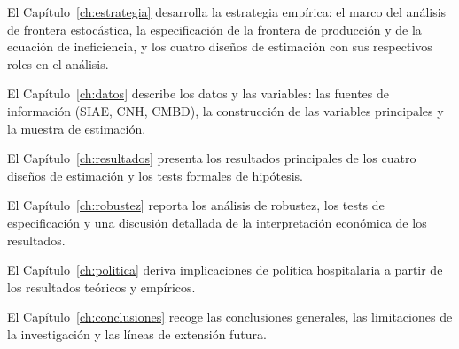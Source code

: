 El Capítulo~\ref{ch:estrategia} desarrolla la estrategia empírica: el marco del análisis de frontera estocástica, la especificación de la frontera de producción y de la ecuación de ineficiencia, y los cuatro diseños de estimación con sus respectivos roles en el análisis.

El Capítulo~\ref{ch:datos} describe los datos y las variables: las fuentes de información (SIAE, CNH, CMBD), la construcción de las variables principales y la muestra de estimación.

El Capítulo~\ref{ch:resultados} presenta los resultados principales de los cuatro diseños de estimación y los tests formales de hipótesis.

El Capítulo~\ref{ch:robustez} reporta los análisis de robustez, los tests de especificación y una discusión detallada de la interpretación económica de los resultados.

El Capítulo~\ref{ch:politica} deriva implicaciones de política hospitalaria a partir de los resultados teóricos y empíricos.

El Capítulo~\ref{ch:conclusiones} recoge las conclusiones generales, las limitaciones de la investigación y las líneas de extensión futura.
